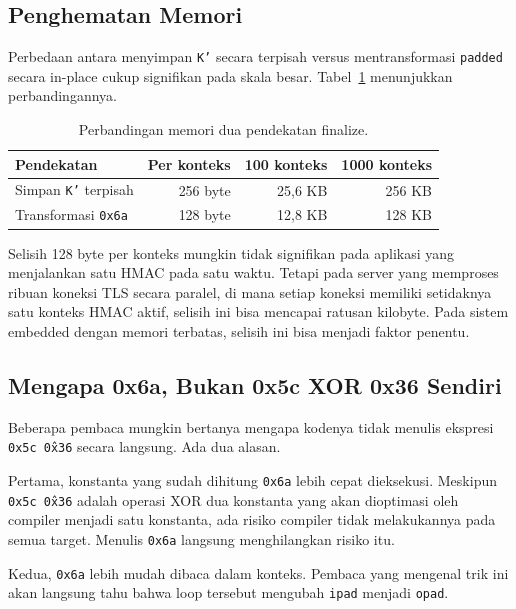 \documentclass[11pt,a4paper]{article}
\begin{document}
\subsection{Penghematan Memori}

Perbedaan antara menyimpan \texttt{K'} secara terpisah versus mentransformasi \texttt{padded} secara in-place cukup signifikan pada skala besar. Tabel~\ref{tab:memory-savings} menunjukkan perbandingannya.

\begin{table}[H]
	\centering
	\caption{Perbandingan memori dua pendekatan finalize.}
	\label{tab:memory-savings}
	\small
	\begin{tabularx}{\textwidth}{l r r r}
		\toprule
		Pendekatan                  & Per konteks & 100 konteks & 1000 konteks \\
		\midrule
		Simpan \texttt{K'} terpisah & 256 byte    & 25,6 KB     & 256 KB       \\
		Transformasi \texttt{0x6a}  & 128 byte    & 12,8 KB     & 128 KB       \\
		\bottomrule
	\end{tabularx}
\end{table}

Selisih 128 byte per konteks mungkin tidak signifikan pada aplikasi yang menjalankan satu HMAC pada satu waktu. Tetapi pada server yang memproses ribuan koneksi TLS secara paralel, di mana setiap koneksi memiliki setidaknya satu konteks HMAC aktif, selisih ini bisa mencapai ratusan kilobyte. Pada sistem embedded dengan memori terbatas, selisih ini bisa menjadi faktor penentu.

\subsection{Mengapa 0x6a, Bukan 0x5c XOR 0x36 Sendiri}

Beberapa pembaca mungkin bertanya mengapa kodenya tidak menulis ekspresi \texttt{0x5c \^ 0x36} secara langsung. Ada dua alasan.

Pertama, konstanta yang sudah dihitung \texttt{0x6a} lebih cepat dieksekusi. Meskipun \texttt{0x5c \^ 0x36} adalah operasi XOR dua konstanta yang akan dioptimasi oleh compiler menjadi satu konstanta, ada risiko compiler tidak melakukannya pada semua target. Menulis \texttt{0x6a} langsung menghilangkan risiko itu.

Kedua, \texttt{0x6a} lebih mudah dibaca dalam konteks. Pembaca yang mengenal trik ini akan langsung tahu bahwa loop tersebut mengubah \texttt{ipad} menjadi \texttt{opad}.
\end{document}
